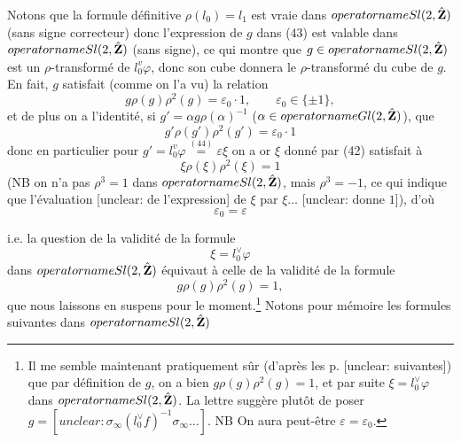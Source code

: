 \begin{enumerate}
Notons que la formule définitive $\rho(l_0) = l_1$
est vraie dans $\\operatorname{Sl}(2,\hat{\mathbf{Z}})$ (sans signe correcteur)
donc l'expression de $g$ dans (43) est valable dans
$\\operatorname{Sl}(2,\hat{\mathbf{Z}})$ (sans signe), ce qui montre que
$g \in \\operatorname{Sl}(2,\hat{\mathbf{Z}})$ est un $\rho$-transformé
de $l_0^v \varphi$, donc son cube donnera le $\rho$-transformé
du cube de $g$. En fait, $g$ satisfait (comme on l'a vu) la
relation
$$
g \rho(g) \rho^2(g) = \varepsilon_0 \cdot 1, \qquad \varepsilon_0 \in \{\pm 1\},
$$
et de plus on a l'identité, si $g' = \alpha g \rho(\alpha)^{-1}$
($\alpha \in \\operatorname{Gl}(2,\hat{\mathbf{Z}})$), que
$$
g' \rho(g') \rho^2(g') = \varepsilon_0 \cdot 1
$$
donc en particulier pour $g' = l_0^v \varphi \overset{(44)}{=} \varepsilon \xi$
on a or $\xi$ donné par (42) satisfait à
$$
\xi \rho(\xi) \rho^2(\xi) = 1
$$
(NB on n'a pas $\rho^3 = 1$ dans $\\operatorname{Sl}(2,\hat{\mathbf{Z}})$, mais
$\rho^3 = -1$, ce qui indique que l'évaluation [unclear: de l'expression]
de $\xi$ par $\xi \dots$ [unclear: donne $1$]), d'où
$$
\varepsilon_0 = \varepsilon
$$

\newpage


i.e. la question de la validité de la formule
$$ \xi = l_0^\vee \varphi $$
dans $\\operatorname{Sl}(2,\hat{\mathbf{Z}})$ équivaut à celle de la validité
de la formule
$$ g \rho(g) \rho^2(g) = 1 , $$
que nous laissons en suspens pour le
moment.\footnote{Il me semble maintenant pratiquement sûr (d'après les p. [unclear: suivantes]) que par définition de $g$, on a bien $g \rho(g) \rho^2(g) = 1$, et par suite $\xi = l_0^\vee \varphi$ dans $\\operatorname{Sl}(2,\hat{\mathbf{Z}})$. La lettre suggère plutôt de poser $g = [unclear: \sigma_\infty (l_0^\vee f)^{-1} \sigma_\infty \dots]$. NB On aura peut-être $\varepsilon = \varepsilon_0$.} Notons pour mémoire les
formules suivantes dans $\\operatorname{Sl}(2,\hat{\mathbf{Z}})$


\end{enumerate}
